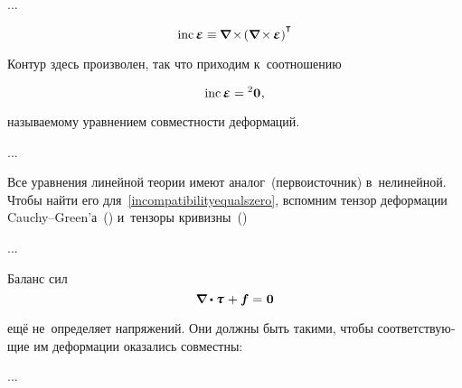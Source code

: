 \begin{otherlanguage}{russian}
...

\begin{equation*}
\operatorname{inc} \mathboldepsilon \equiv
\hspace{-0.1ex} \boldnabla \hspace{-0.2ex} \times \hspace{-0.25ex} \left( \boldnabla \hspace{-0.2ex} \times \hspace{-0.16ex} \mathboldepsilon \right)^{\T}
\end{equation*}

Контур здесь произволен, так что приходим к~соотношению

\nopagebreak\vspace{-0.2em}\begin{equation}\label{incompatibilityequalszero}
\operatorname{inc} \mathboldepsilon = {^2\bm{0}} \hspace{.1ex} ,
\end{equation}

\vspace{-0.4em} \noindent называемому уравнением совместности деформаций.

...

Все уравнения линейной теории имеют аналог~(перво\-источ\-ник) в~нелинейной. Чтобы найти его для~\eqref{incompatibilityequalszero}, вспомним тензор деформации Cauchy\hbox{--}Green’а~() и~тензоры кривизны~()

...



\end{otherlanguage}



\begin{otherlanguage}{russian}

Баланс сил
\nopagebreak\vspace{-0.32em}\begin{equation}\label{balanceofforces}
\boldnabla \dotp \mathboldtau \hspace{0.15ex} + \bm{f} = \hspace{0.1ex} \bm{0}
\end{equation}

\vspace{-0.5em} \noindent ещё не~определяет напряжений. Они должны быть такими, чтобы соответствующие им деформации оказались совместны:

...



\end{otherlanguage}

